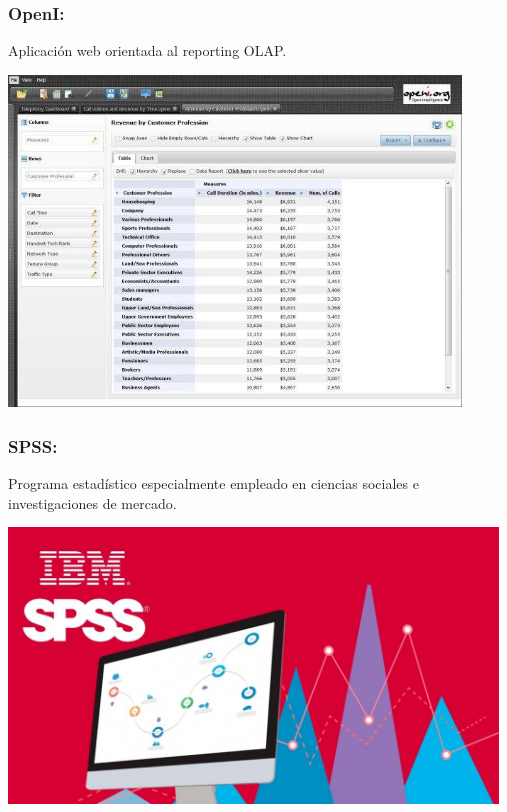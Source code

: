 \subsubsection{OpenI: }\label{sec:nada2} 
Aplicación web orientada al reporting OLAP.
	\begin{center}
	\includegraphics[width=12cm]{./Imagenes/BIimagen13}
	\end{center}
	
\subsubsection{SPSS: }\label{sec:nada2}  
Programa estadístico especialmente empleado en ciencias sociales e investigaciones de mercado.
	\begin{center}
	\includegraphics[width=13cm]{./Imagenes/BIimagen14}
	\end{center}
	
\newpage
